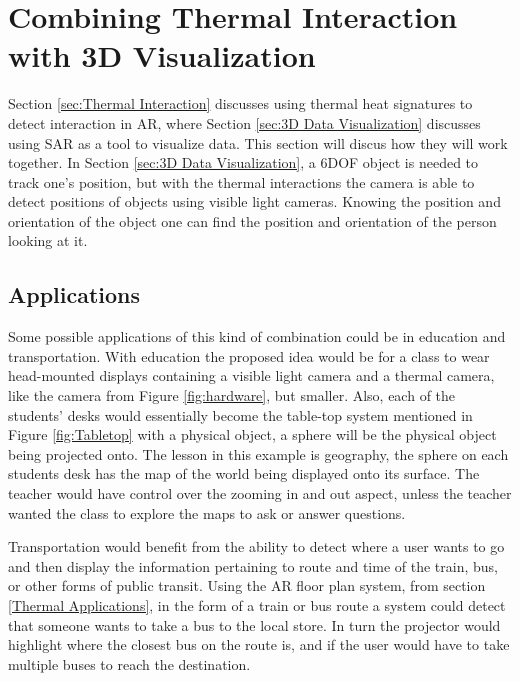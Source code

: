 \documentclass{sig-alternate}
\begin{document}
\section{Combining Thermal Interaction with 3D Visualization}
\label{sec:Joining Together} 
Section \ref{sec:Thermal Interaction} discusses using thermal heat signatures to detect interaction in AR, where Section \ref{sec:3D Data Visualization} discusses using SAR as a tool to visualize data. This section will discus how they will work together. In Section \ref{sec:3D Data Visualization}, a 6DOF object is needed to track one's position, but with the thermal interactions the camera is able to detect positions of objects using visible light cameras. Knowing the position and orientation of the object one can find the position and orientation of the person looking at it.   

\subsection{Applications}
\label{Applications}
Some possible applications of this kind of combination could be in education and transportation. With education the proposed idea would be for a class to wear head-mounted displays containing a visible light camera and a thermal camera, like the camera from Figure \ref{fig:hardware}, but smaller. Also, each of the students' desks would essentially become the table-top system mentioned in Figure \ref{fig:Tabletop} with a physical object, a sphere will be the physical object being projected onto. The lesson in this example is geography, the sphere on each students desk has the map of the world being displayed onto its surface. The teacher would have control over the zooming in and out aspect, unless the teacher wanted the class to explore the maps to ask or answer questions.

Transportation would benefit from the ability to detect where a user wants to go and then display the information pertaining to route and time of the train, bus, or other forms of public transit. Using the AR floor plan system, from section \ref{Thermal Applications}, in the form of a train or bus route a system could detect that someone wants to take a bus to the local store. In turn the projector would highlight where the closest bus on the route is, and if the user would have to take multiple buses to reach the destination. 
\end{document}
